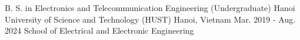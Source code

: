 
\begin{cventries}

  \cventry
  {B.
    S.
    in Electronics and Telecommunication Engineering (Undergraduate)} %
  {Hanoi University of Science and Technology (HUST)} %
  {Hanoi, Vietnam} %
  {Mar. 2019 - Aug. 2024} %
  {School of Electrical and Electronic Engineering}

\end{cventries}
